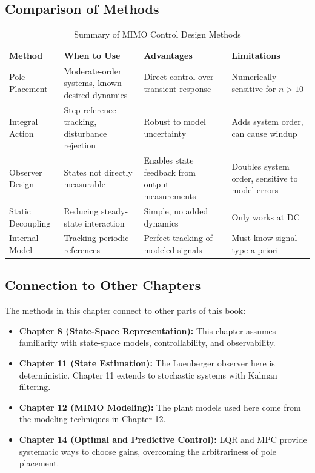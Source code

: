 \subsection{Comparison of Methods}

\begin{table}[htbp]
\centering
\caption{Summary of MIMO Control Design Methods}
\label{tab:method_comparison}
\begin{tabular}{p{3cm}p{4cm}p{4cm}p{3cm}}
\toprule
\textbf{Method} & \textbf{When to Use} & \textbf{Advantages} & \textbf{Limitations} \\
\midrule
Pole Placement & Moderate-order systems, known desired dynamics & Direct control over transient response & Numerically sensitive for $n > 10$ \\
\addlinespace
Integral Action & Step reference tracking, disturbance rejection & Robust to model uncertainty & Adds system order, can cause windup \\
\addlinespace
Observer Design & States not directly measurable & Enables state feedback from output measurements & Doubles system order, sensitive to model errors \\
\addlinespace
Static Decoupling & Reducing steady-state interaction & Simple, no added dynamics & Only works at DC \\
\addlinespace
Internal Model & Tracking periodic references & Perfect tracking of modeled signals & Must know signal type a priori \\
\bottomrule
\end{tabular}
\end{table}

\subsection{Connection to Other Chapters}

The methods in this chapter connect to other parts of this book:

\begin{itemize}
    \item \textbf{Chapter 8 (State-Space Representation):} This chapter assumes familiarity with state-space models, controllability, and observability.

    \item \textbf{Chapter 11 (State Estimation):} The Luenberger observer here is deterministic. Chapter 11 extends to stochastic systems with Kalman filtering.

    \item \textbf{Chapter 12 (MIMO Modeling):} The plant models used here come from the modeling techniques in Chapter 12.

    \item \textbf{Chapter 14 (Optimal and Predictive Control):} LQR and MPC provide systematic ways to choose gains, overcoming the arbitrariness of pole placement.
\end{itemize}

